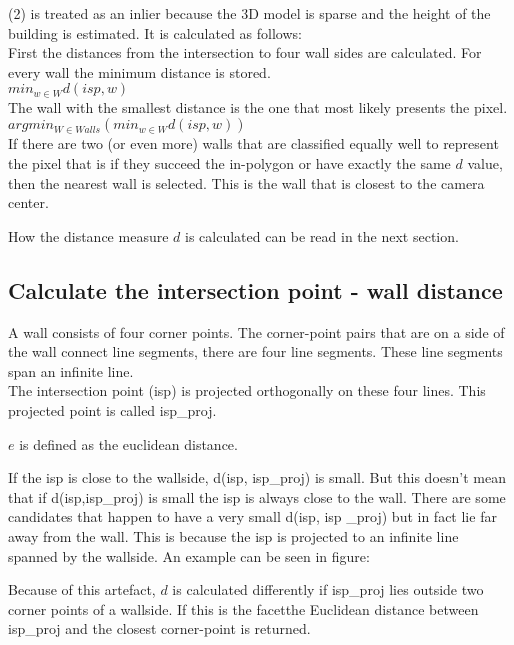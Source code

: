 \documentclass[10pt]{article}
\begin{document}
(2) is treated as an inlier because the 3D model is sparse and the height of
the building is estimated. It is calculated as follows: \\

First the distances from the intersection to four wall sides are calculated.
For every wall the minimum distance is stored.\\
$min_{w\in W} d(isp, w)$\\
The wall with the smallest distance is the one that most likely presents the pixel.\\
$arg min_{W \in Walls} ( min_{w\in W} d(isp, w) )$\\


If there are two (or even more) walls that are classified equally well to
represent the pixel that is if they succeed the in-polygon or have exactly the
same $d$ value, then the nearest wall is selected. This is the wall that is
closest to the camera center. 

How the distance measure $d$ is calculated can be read in the next section.

\subsection{Calculate the intersection point - wall distance}
A wall consists of four corner points. The corner-point pairs that are on a
side of the wall connect line segments, there are four line segments. These
line segments span an infinite line.\\

The intersection point (isp) is projected orthogonally on these four lines.
This projected point is called isp_proj.

$e$ is defined as the euclidean distance. 

If the isp is close to the wallside, d(isp, isp_proj) is small. 
But this doesn't mean that if d(isp,isp_proj) is small the isp is always close to the wall.
There are some candidates that happen to have a very small d(isp, isp
_proj) but in fact lie far away from the wall. This is because the isp
is projected to an infinite line spanned by the wallside.
An example can be seen in figure:

Because of this artefact, $d$ is calculated differently if isp_proj lies
outside two corner points of a wallside. If this is the facetthe Euclidean distance between isp_proj and 
the closest corner-point is returned.
\end{document}
